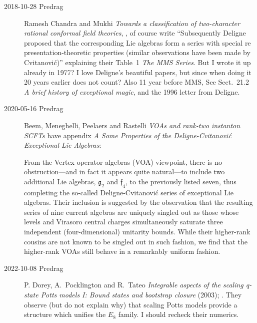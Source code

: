 \begin{description}
\item[2018-10-28 Predrag]
Ramesh Chandra and Mukhi
{\em Towards a classification of two-character rational conformal field theories},
,
of course write
``Subsequently Deligne proposed that the corresponding Lie algebras form
a series with special re presentation-theoretic properties (similar observations
have been made by Cvitanovi{\'c})''
explaining their Table~1
{\em The MMS Series}. But I wrote it up already in
1977? I love Deligne's beautiful papers, but since when doing it 20 years earlier
does not count? Also 11 year before MMS, See Sect.~21.2 {\em A brief history of exceptional magic}, and the
 {1996 letter}
from Deligne.

\item[2020-05-16 Predrag]
Beem, Meneghelli, Peelaers and Rastelli
{\em {VOAs} and rank-two instanton {SCFTs}}
have appendix {\em A Some Properties of the Deligne-Cvitanovi{\'c}
Exceptional Lie Algebras}:

From the Vertex operator algebras (VOA) viewpoint, there is no
obstruction---and in fact it appears quite natural---to include two
additional Lie algebras, $\mathfrak{g}_2$ and $\mathfrak{f}_4$, to the
previously listed seven, thus completing the so-called
Deligne-Cvitanovi{\'c} series of exceptional Lie algebras.
Their inclusion is suggested by the observation that the resulting series
of nine current algebras are uniquely singled out as those whose levels
and Virasoro central charges simultaneously saturate three independent
(four-dimensional) unitarity bounds. While their higher-rank cousins are
not known to be singled out in such fashion, we find that the higher-rank
VOAs still behave in a remarkably uniform fashion.

\item[2022-10-08 Predrag]
{P. Dorey},
A.~Pocklington and  
{R.~Tateo} 
{\em Integrable aspects of the scaling q-state Potts models I:
    Bound states and bootstrap closure}
(2003);
.
They observe (but do not explain why) that
scaling Potts models provide a structure which unifies the $E_8$ family.
I should recheck their numerics.


\end{description}
